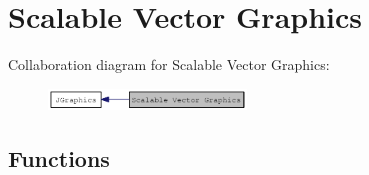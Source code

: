 \hypertarget{group__jsvg}{
\section{Scalable Vector Graphics}
\label{group__jsvg}
}


Collaboration diagram for Scalable Vector Graphics:\nopagebreak
\begin{figure}[H]
\begin{center}
\leavevmode
\includegraphics[width=149pt]{group__jsvg}
\end{center}
\end{figure}
\subsection*{Functions}
